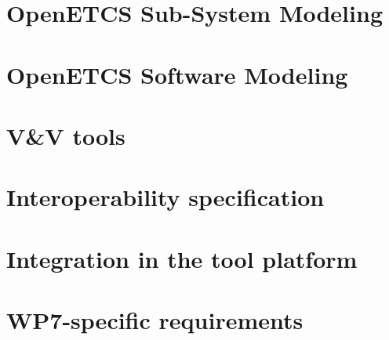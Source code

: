 \documentclass{openetcs_report}
\begin{document}


\chapter{OpenETCS Sub-System Modeling}
\label{chap:sysphase}



\chapter{OpenETCS  Software Modeling}
\label{chap:softphase}



\chapter{V\&V tools}
\label{chap:VnV}


\chapter{Interoperability specification}
\label{chap:interope}



\chapter{Integration in the tool platform}
\label{chap:integration}





\appendix





\chapter{WP7-specific requirements}
\label{app:WP7Req}


\end{document}
